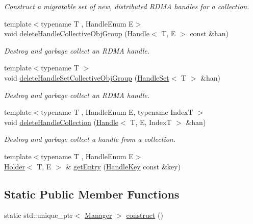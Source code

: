 \begin{DoxyCompactItemize}
\begin{DoxyCompactList}\small\item\em Construct a migratable set of new, distributed R\+D\+MA handles for a collection. \end{DoxyCompactList}\item 
{\footnotesize template$<$typename T , Handle\+Enum E$>$ }\\void \hyperlink{structvt_1_1rdma_1_1_manager_a4219310feca011fd242e654c9ba51280}{delete\+Handle\+Collective\+Obj\+Group} (\hyperlink{structvt_1_1rdma_1_1_handle}{Handle}$<$ T, E $>$ const \&han)
\begin{DoxyCompactList}\small\item\em Destroy and garbage collect an R\+D\+MA handle. \end{DoxyCompactList}\item 
{\footnotesize template$<$typename T $>$ }\\void \hyperlink{structvt_1_1rdma_1_1_manager_a9b3b9bf148a8225295879481345e4af3}{delete\+Handle\+Set\+Collective\+Obj\+Group} (\hyperlink{structvt_1_1rdma_1_1_handle_set}{Handle\+Set}$<$ T $>$ \&han)
\begin{DoxyCompactList}\small\item\em Destroy and garbage collect an R\+D\+MA handle. \end{DoxyCompactList}\item 
{\footnotesize template$<$typename T , Handle\+Enum E, typename IndexT $>$ }\\void \hyperlink{structvt_1_1rdma_1_1_manager_a3a1f982e986d58e91837a2b1aa048468}{delete\+Handle\+Collection} (\hyperlink{structvt_1_1rdma_1_1_handle}{Handle}$<$ T, E, IndexT $>$ \&han)
\begin{DoxyCompactList}\small\item\em Destroy and garbage collect a handle from a collection. \end{DoxyCompactList}\item 
{\footnotesize template$<$typename T , Handle\+Enum E$>$ }\\\hyperlink{structvt_1_1rdma_1_1_holder}{Holder}$<$ T, E $>$ \& \hyperlink{structvt_1_1rdma_1_1_manager_a60c463246971a6d782e55f13fd60d092}{get\+Entry} (\hyperlink{structvt_1_1rdma_1_1_handle_key}{Handle\+Key} const \&key)
\end{DoxyCompactItemize}
\subsection*{Static Public Member Functions}
\begin{DoxyCompactItemize}
\item 
static std\+::unique\+\_\+ptr$<$ \hyperlink{structvt_1_1rdma_1_1_manager}{Manager} $>$ \hyperlink{structvt_1_1rdma_1_1_manager_ab79a91b3feabfc37e6f0b5000e9d3949}{construct} ()
\end{DoxyCompactItemize}
